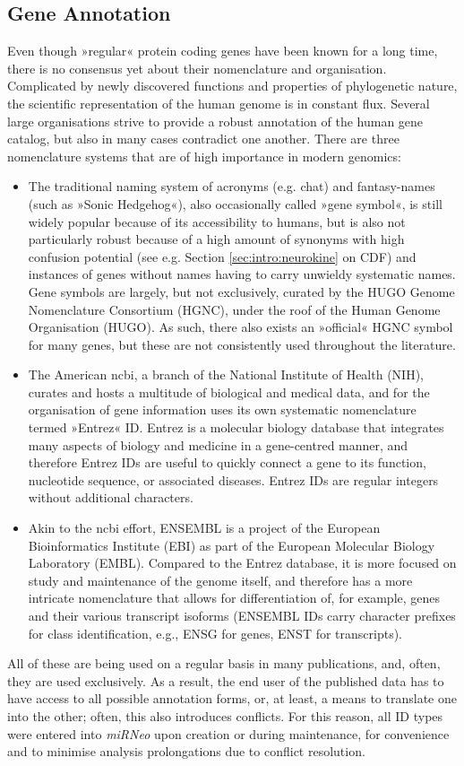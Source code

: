 \subsection{Gene Annotation}
Even though »regular« protein coding genes have been known for a long time, there is no consensus yet about their nomenclature and organisation. Complicated by newly discovered functions and properties of phylogenetic nature, the scientific representation of the human genome is in constant flux. Several large organisations strive to provide a robust annotation of the human gene catalog, but also in many cases contradict one another. There are three nomenclature systems that are of high importance in modern genomics: 
\begin{itemize}[noitemsep, leftmargin=.5cm, label={\tiny\raisebox{.5ex}{\textbullet}}]
\item The traditional naming system of acronyms (e.g. \ac{chat}) and fantasy-names (such as »Sonic Hedgehog«), also occasionally called »gene symbol«, is still widely popular because of its accessibility to humans, but is also not particularly robust because of a high amount of synonyms with high confusion potential (see e.g. Section \ref{sec:intro:neurokine} on CDF) and instances of genes without names having to carry unwieldy systematic names. Gene symbols are largely, but not exclusively, curated by the HUGO Genome Nomenclature Consortium (HGNC), under the roof of the Human Genome Organisation (HUGO). As such, there also exists an »official« HGNC symbol for many genes, but these are not consistently used throughout the literature.
\item The American \ac{ncbi}, a branch of the National Institute of Health (NIH), curates and hosts a multitude of biological and medical data, and for the organisation of gene information uses its own systematic nomenclature termed »Entrez« ID. Entrez is a molecular biology database that integrates many aspects of biology and medicine in a gene-centred manner, and therefore Entrez IDs are useful to quickly connect a gene to its function, nucleotide sequence, or associated diseases. Entrez IDs are regular integers without additional characters.
\item Akin to the \ac{ncbi} effort, ENSEMBL is a project of the European Bioinformatics Institute (EBI) as part of the European Molecular Biology Laboratory (EMBL). Compared to the Entrez database, it is more focused on study and maintenance of the genome itself, and therefore has a more intricate nomenclature that allows for differentiation of, for example, genes and their various transcript isoforms (ENSEMBL IDs carry character prefixes for class identification, e.g., ENSG for genes, ENST for transcripts).
\end{itemize}
All of these are being used on a regular basis in many publications, and, often, they are used exclusively. As a result, the end user of the published data has to have access to all possible annotation forms, or, at least, a means to translate one into the other; often, this also introduces conflicts. For this reason, all ID types were entered into \textit{miRNeo} upon creation or during maintenance, for convenience and to minimise analysis prolongations due to conflict resolution.

